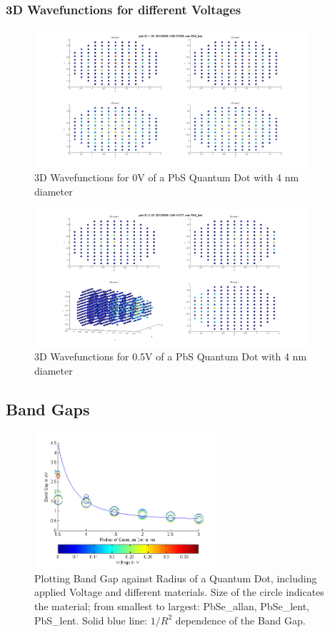 \documentclass[a4paper, 11pt, landscape]{article}
\begin{document}
			\newpage
			\subsubsection*{3D Wavefunctions for different Voltages}
				\begin{figure}[htbp]
					\centering
					\includegraphics[width=0.9\textwidth]{figures/EVPlot3DVolt1.png}
					\caption{3D Wavefunctions for 0V of a PbS Quantum Dot with 4 nm  diameter}
				\end{figure}
				\newpage
				\begin{figure}[htbp]
					\centering
					\includegraphics[width=0.9\textwidth]{figures/EVPlot3DVolt6.png}
					\caption{3D Wavefunctions for 0.5V of a PbS Quantum Dot with 4 nm  diameter}
				\end{figure}

		
		\newpage
		\subsection{Band Gaps}
			\begin{figure}[htbp]
				\centering
				\includegraphics[width=0.6\textwidth]{figures/BandGapAll.png}
				\caption{Plotting Band Gap against Radius of a Quantum Dot, including applied Voltage and 
								 different materials. Size of the circle indicates the material; from smallest to largest:
								 PbSe\_allan, PbSe\_lent, PbS\_lent. Solid blue line: $1/R^2$ dependence of the Band Gap.}
			\end{figure}
			
\end{document}
